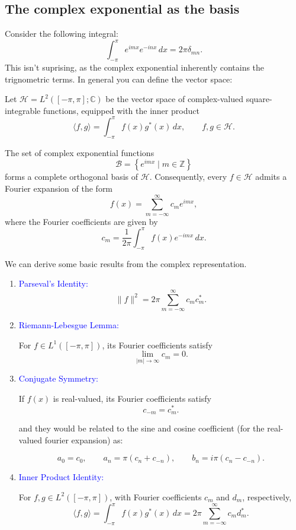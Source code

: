 \documentclass[10pt,a4paper]{article}
\begin{document}
\subsection{The complex exponential as the basis}
Consider the following integral:
\[
    \int_{-\pi}^{\pi}e^{imx}e^{-inx}\,dx
    =
    2\pi\delta_{mn}.
\]
This isn't suprising, as the complex exponential inherently contains the trignometric terms. In general you can define the vector space:
\begin{definition}
Let \(\mathcal{H}=L^2([-\pi,\pi];\mathbb{C})\) be the
vector space of complex-valued square-integrable functions,
equipped with the inner product
\[
    \langle f,g\rangle
    =
    \int_{-\pi}^{\pi}f(x)g^*(x)\,dx,
    \qquad f,g\in\mathcal{H}.
\]

The set of complex exponential functions
\[
    \mathcal{B}
    =
    \left\{
    e^{imx}\mid m\in\mathbb{Z}
    \right\}
\]
forms a complete orthogonal basis of \(\mathcal{H}\). Consequently, every \(f\in\mathcal{H}\) admits a
Fourier expansion of the form
\[
    f(x)=\sum_{m=-\infty}^{\infty}c_m e^{imx},
\]
where the Fourier coefficients are given by
\[
    c_m=\frac{1}{2\pi}
    \int_{-\pi}^{\pi}f(x)e^{-imx}\,dx.
\]
\end{definition}

We can derive some basic results from the complex representation.

\begin{enumerate}
    \item \textcolor{blue}{Parseval's Identity:}
    \[
        \lVert f\rVert^2
        =2\pi\sum_{m=-\infty}^{\infty}c_m c_m^{*}.
    \]

    \item \textcolor{blue}{Riemann-Lebesgue Lemma:}

    For \(f\in L^1([-\pi,\pi])\), its Fourier coefficients satisfy
    \[
        \lim_{|m|\to\infty}c_m=0.
    \]

    \item \textcolor{blue}{Conjugate Symmetry:}

    If \(f(x)\) is real-valued, its Fourier coefficients satisfy
    \[
        c_{-m}=c_m^{*}.
    \]

    and they would be related to the sine and cosine coefficient (for the real-valued fourier expansion) as:

    \[
        a_0=c_0,\qquad
        a_n=\pi(c_n+c_{-n}),\qquad
        b_n=i\pi(c_n-c_{-n}).
    \]

    \item \textcolor{blue}{Inner Product Identity:}

    For \(f,g\in L^2([-\pi,\pi])\), with Fourier coefficients
    \(c_m\) and \(d_m\), respectively,
    \[
        \langle f,g\rangle
        =\int_{-\pi}^{\pi}f(x)g^{*}(x)\,dx
        =2\pi\sum_{m=-\infty}^{\infty}c_m d_m^{*}.
    \]
\end{enumerate}
\end{document}
